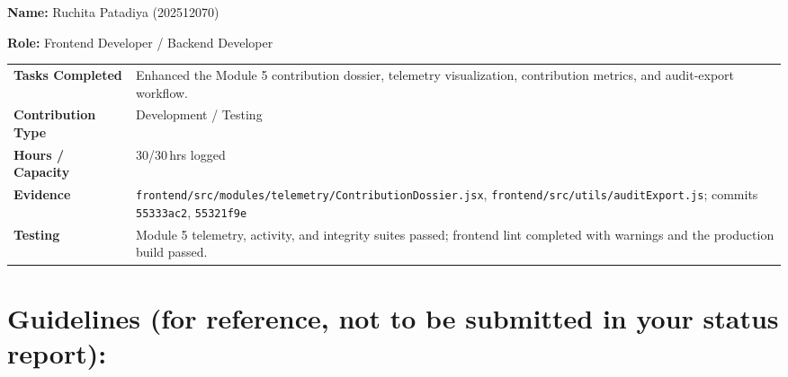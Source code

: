 \documentclass[11pt,a4paper]{article}
\newcommand{\field}[2]{\textbf{#1:} #2\par}
\begin{document}
\field{Name}{Ruchita Patadiya (202512070)}
\field{Role}{Frontend Developer / Backend Developer}
{\small
\begin{tabular}{>{\bfseries}p{} p{}}
\toprule
Tasks Completed & Enhanced the Module 5 contribution dossier, telemetry visualization, contribution metrics, and audit-export workflow. \\
Contribution Type & Development / Testing \\
Hours / Capacity & 30/30\,hrs logged \\
Evidence & \texttt{frontend/src/modules/telemetry/ContributionDossier.jsx}, \texttt{frontend/src/utils/auditExport.js}; commits \texttt{55333ac2}, \texttt{55321f9e} \\
Testing & Module 5 telemetry, activity, and integrity suites passed; frontend lint completed with warnings and the production build passed. \\
\bottomrule
\end{tabular}
}

\section{Guidelines (for reference, not to be submitted in your status report):}
\end{document}
